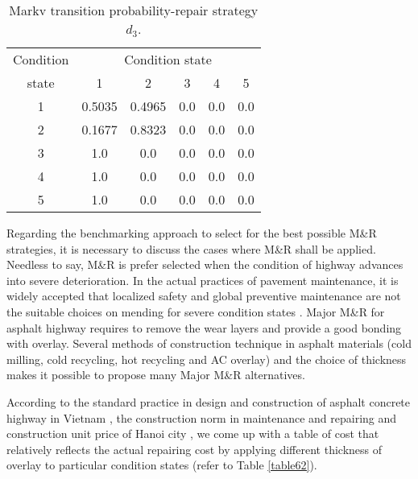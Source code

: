 \begin{table}[t]
\caption{Markv transition probability-repair strategy $d_3$.}
\label{table65}
\begin{center}
{\small
\begin{tabular}{l|lllll}
\hline
\multicolumn{1}{c|}{Condition} & \multicolumn{5}{c}{Condition state} \\ 
\multicolumn{1}{c|}{state} & \multicolumn{1}{c}{1} & \multicolumn{1}{c}{2} & \multicolumn{1}{c}{3} & \multicolumn{1}{c}{4} & \multicolumn{1}{c}{5} \\ 
\hline
\multicolumn{1}{c|}{1} & \multicolumn{1}{c}{0.5035} & \multicolumn{1}{c}{0.4965} & \multicolumn{1}{c}{0.0} & \multicolumn{1}{c}{0.0} & \multicolumn{1}{c}{0.0} \\ 
\multicolumn{1}{c|}{2} & \multicolumn{1}{c}{0.1677} & \multicolumn{1}{c}{0.8323} & \multicolumn{1}{c}{0.0} & \multicolumn{1}{c}{0.0} & \multicolumn{1}{c}{0.0} \\ 
\multicolumn{1}{c|}{3} & \multicolumn{1}{c}{1.0} & \multicolumn{1}{c}{0.0} & \multicolumn{1}{c}{0.0} & \multicolumn{1}{c}{0.0} & \multicolumn{1}{c}{0.0} \\ 
\multicolumn{1}{c|}{4} & \multicolumn{1}{c}{1.0} & \multicolumn{1}{c}{0.0} & \multicolumn{1}{c}{0.0} & \multicolumn{1}{c}{0.0} & \multicolumn{1}{c}{0.0} \\ 
\multicolumn{1}{c|}{5} & \multicolumn{1}{c}{1.0} & \multicolumn{1}{c}{0.0} & \multicolumn{1}{c}{0.0} & \multicolumn{1}{c}{0.0} & \multicolumn{1}{c}{0.0} \\ 
\hline
\end{tabular}
}
\end{center}
\end{table}
Regarding the benchmarking approach to select for the best possible M\&R strategies, it is necessary to discuss the cases where M\&R shall be applied. Needless to say, M\&R is prefer selected  when the condition of highway advances into severe deterioration. In the actual practices of pavement maintenance, it is widely accepted that localized safety and global preventive maintenance are not the suitable choices on mending for severe condition states \cite{shahin05}. Major M{\&}R for asphalt highway requires to remove the  wear layers and provide a good bonding with overlay. Several methods of construction technique in asphalt materials (cold milling, cold recycling, hot recycling and AC overlay) and the choice of thickness makes it possible to propose many Major M{\&}R alternatives.

According to the standard practice in design and construction of  asphalt concrete highway in Vietnam \cite{tcnn22}, the construction norm in maintenance and repairing\cite{dm1242} and construction unit price of Hanoi city \cite{dghanoi08}, we come up with a table of cost that relatively reflects the actual repairing cost by applying different thickness of overlay to particular condition states (refer to Table \ref{table62}). 

